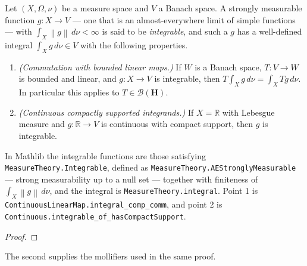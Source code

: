 \begin{theorem}
    \label{thrm:bochner-integral}
    \leanok
    Let $(X,\Omega,\nu)$ be a measure space and $V$ a Banach space. A strongly measurable function $g : X \rightarrow V$ — one that is an almost-everywhere limit of simple functions — with $\int_X \left\| g \right\| \, d\nu < \infty$ is said to be \textit{integrable}, and such a $g$ has a well-defined integral $\int_X g \, d\nu \in V$ with the following properties.
    \begin{enumerate}
        \item \textit{(Commutation with bounded linear maps.)} If $W$ is a Banach space, $T : V \rightarrow W$ is bounded and linear, and $g : X \rightarrow V$ is integrable, then $T \int_X g \, d\nu = \int_X T g \, d\nu$. In particular this applies to $T \in \mathcal{B}(\mathbf{H})$.
        \item \textit{(Continuous compactly supported integrands.)} If $X = \mathbb{R}$ with Lebesgue measure and $g : \mathbb{R} \rightarrow V$ is continuous with compact support, then $g$ is integrable.
    \end{enumerate}
    In Mathlib the integrable functions are those satisfying \texttt{MeasureTheory.Integrable}, defined as \texttt{MeasureTheory.AEStronglyMeasurable} — strong measurability up to a null set — together with finiteness of $\int_X \left\| g \right\| \, d\nu$, and the integral is \texttt{MeasureTheory.integral}. Point 1 is \texttt{ContinuousLinearMap.integral\_comp\_comm}, and point 2 is \texttt{Continuous.integrable\_of\_hasCompactSupport}.
\end{theorem}
\begin{proof}
\leanok
\end{proof}

The second supplies the mollifiers used in the same proof.

